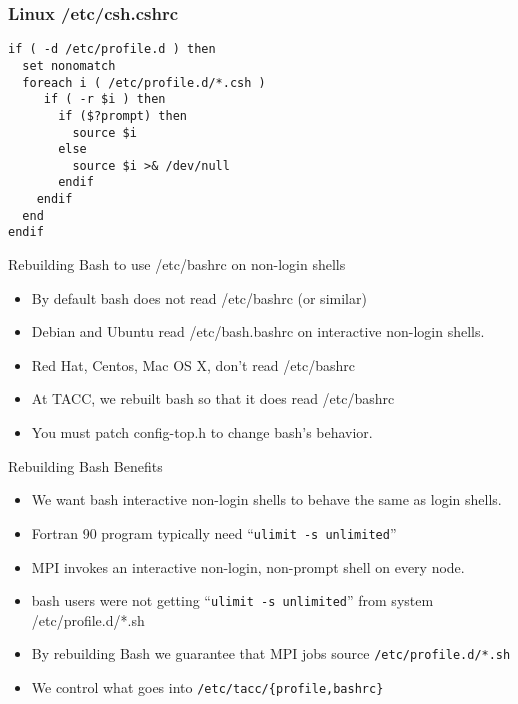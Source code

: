\documentclass{beamer}
\begin{document}
\begin{frame}[fragile]
    \frametitle{Linux /etc/csh.cshrc}
    {
\begin{verbatim}
if ( -d /etc/profile.d ) then
  set nonomatch
  foreach i ( /etc/profile.d/*.csh )
     if ( -r $i ) then
       if ($?prompt) then
         source $i
       else
         source $i >& /dev/null
       endif
    endif
  end
endif
\end{verbatim}
    }
\end{frame}

\begin{frame}{Rebuilding Bash to use /etc/bashrc on non-login shells}
  \begin{itemize}
    \item By default bash does not read /etc/bashrc (or similar)
    \item Debian and Ubuntu read /etc/bash.bashrc on interactive
      non-login shells.
    \item Red Hat, Centos,  Mac OS X, don't read /etc/bashrc
    \item At TACC, we rebuilt bash so that it does read /etc/bashrc
    \item You must patch config-top.h to change bash's behavior.
  \end{itemize}
\end{frame}

\begin{frame}{Rebuilding Bash Benefits}
  \begin{itemize}
    \item We want bash interactive non-login shells to behave the same
      as login shells.
    \item Fortran 90 program typically need ``\texttt{ulimit -s unlimited}''
    \item MPI invokes an interactive non-login, non-prompt shell on
      every node.
    \item bash users were not getting ``\texttt{ulimit -s unlimited}''
      from system /etc/profile.d/*.sh
    \item By rebuilding Bash we guarantee that MPI jobs source \texttt{/etc/profile.d/*.sh}
    \item We control what goes into \texttt{/etc/tacc/\{profile,bashrc\}}
  \end{itemize}
\end{frame}
\end{document}

